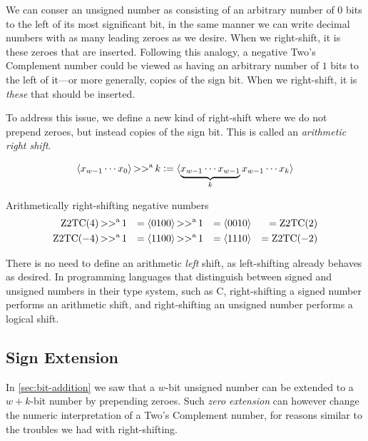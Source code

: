 We can conser an unsigned number as consisting of an arbitrary number
of $0$ bits to the left of its most significant bit, in the same
manner we can write decimal numbers with as many leading zeroes as we
desire.  When we right-shift, it is these zeroes that are inserted.
Following this analogy, a negative Two's Complement number could be
viewed as having an arbitrary number of $1$ bits to the left of
it---or more generally, copies of the sign bit.  When we right-shift,
it is \emph{these} that should be inserted.

To address this issue, we define a new kind of right-shift where we do
not prepend zeroes, but instead copies of the sign bit.  This is
called an \emph{arithmetic right shift}.

\begin{definition}
  \begin{align*}
    \langle x_{w-1}\cdots{}x_{0} \rangle \operatorname{>>^{a}} k \vcentcolon=
    \langle \underbrace{x_{w-1} \cdots x_{w-1}}_{k} x_{w-1}\cdots{}x_{k} \rangle
  \end{align*}
  \label{def:bits-rightshift-arithmetic}
\end{definition}

\begin{example}{Arithmetically right-shifting negative numbers}
  \begin{align}
    \mathrm{Z2TC}(4) \operatorname{>>^{a}} 1 &&= \langle 0100 \rangle \operatorname{>>^{a}} 1 &&= \langle 0010 \rangle &&= \mathrm{Z2TC}(2) \\
    \mathrm{Z2TC}(-4) \operatorname{>>^{a}} 1 &&= \langle 1100 \rangle \operatorname{>>^{a}} 1 &&= \langle 1110 \rangle &&= \mathrm{Z2TC}(-2)
  \end{align}
\end{example}

There is no need to define an arithmetic \emph{left} shift, as
left-shifting already behaves as desired.  In programming languages
that distinguish between signed and unsigned numbers in their type
system, such as C, right-shifting a signed number performs an
arithmetic shift, and right-shifting an unsigned number performs a
logical shift.

\subsection{Sign Extension}
\label{sec:sign-extension}

In \cref{sec:bit-addition} we saw that a $w$-bit unsigned number can
be extended to a $w+k$-bit number by prepending zeroes.  Such
\emph{zero extension} can however change the numeric interpretation of
a Two's Complement number, for reasons similar to the troubles we had
with right-shifting.

